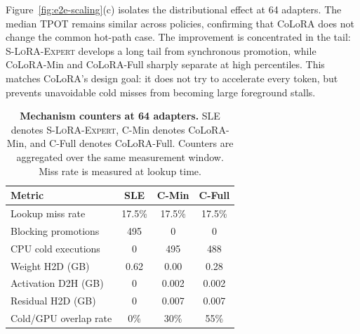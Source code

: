 \documentclass[sigplan,anonymous,review,10pt]{acmart}
\begin{document}
Figure~\ref{fig:e2e-scaling}(c) isolates the distributional effect at 64 adapters. The median TPOT remains similar across policies, confirming that CoLoRA does not change the common hot-path case. The improvement is concentrated in the tail: \textsc{S-LoRA-Expert} develops a long tail from synchronous promotion, while CoLoRA-Min and CoLoRA-Full sharply separate at high percentiles. This matches CoLoRA's design goal: it does not try to accelerate every token, but prevents unavoidable cold misses from becoming large foreground stalls.

\begin{table}[t]
\begin{small}
  \centering
  \setlength{\tabcolsep}{3.2pt}
  \begin{tabular}{@{}lccc@{}}
    \toprule
    \textbf{Metric} & \textbf{SLE} & \textbf{C-Min} & \textbf{C-Full} \\
    \midrule
    Lookup miss rate        & 17.5\% & 17.5\% & 17.5\% \\
    Blocking promotions     & 495    & 0      & 0      \\
    CPU cold executions     & 0      & 495    & 488    \\
    Weight H2D (GB)         & 0.62   & 0.00   & 0.28   \\
    Activation D2H (GB)     & 0      & 0.002  & 0.002  \\
    Residual H2D (GB)       & 0      & 0.007  & 0.007  \\
    Cold/GPU overlap rate   & 0\%    & 30\%   & 55\%   \\
    \bottomrule
  \end{tabular}
\end{small}
  \caption{
    \textbf{Mechanism counters at 64 adapters.}
 SLE denotes \textsc{S-LoRA-Expert}, C-Min denotes CoLoRA-Min, and C-Full denotes CoLoRA-Full. Counters are aggregated over the same measurement window. Miss rate is measured at lookup time.
  }
  \label{tab:real-trace-mechanisms}
\end{table}
\end{document}
